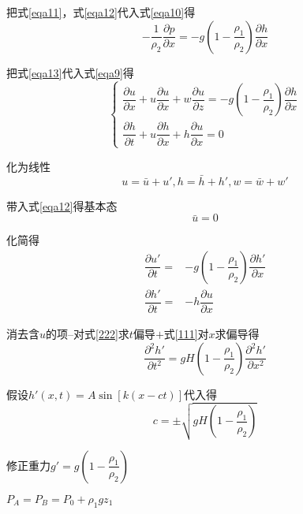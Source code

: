 \documentclass[a4paper,oneside]{ctexbook}
\begin{document}
把式\ref{eqa11}，式\ref{eqa12}代入式\ref{eqa10}得
\begin{equation}
    -\dfrac{1}{\rho_2}\dfrac{\partial{p}}{\partial{x}}=-g\left(1-\dfrac{\rho_1}{\rho_2}\right)\dfrac{\partial{h}}{\partial{x}}\label{eqa13}
\end{equation}

把式\ref{eqa13}代入式\ref{eqa9}得
\begin{equation}
    \begin{cases}
    \dfrac{\partial{u}}{\partial{x}}+u\dfrac{\partial{u}}{\partial{x}}+w\dfrac{\partial{u}}{\partial{z}}=-g\left(1-\dfrac{\rho_1}{\rho_2}\right)\dfrac{\partial{h}}{\partial{x}}\\
    \dfrac{\partial{h}}{\partial{t}}+u\dfrac{\partial{h}}{\partial{x}}+h\dfrac{\partial{u}}{\partial{x}}=0
    \end{cases}
\end{equation}

化为线性
\begin{equation}
    u=\bar{u}+u',h=\bar{h}+h',w=\bar{w}+w'
\end{equation}

带入式\ref{eqa12}得基本态
\begin{equation}
    \bar{u}=0
\end{equation}

化简得
\begin{align}
    \dfrac{\partial{u'}}{\partial{t}} =& -g\left(1-\dfrac{\rho_1}{\rho_2}\right)\dfrac{\partial{h'}}{\partial{x}} \label{111}\\
    \dfrac{\partial{h'}}{\partial{t}} =& -h\dfrac{\partial{u}}{\partial{x}} \label{222}
\end{align}

消去含\(u\)的项--对式\ref{222}求\(t\)偏导\(+\)式\ref{111}对\(x\)求偏导得
\begin{equation}
    \dfrac{\partial^2h'}{\partial{t^2}}=gH\left(1-\dfrac{\rho_1}{\rho_2}\right)\dfrac{\partial^2h'}{\partial{x^2}}
\end{equation}

假设\(h'(x,t)=A\sin{}[k(x-ct)]\)代入得
\begin{equation}
    c=\pm\sqrt{gH\left(1-\dfrac{\rho_1}{\rho_2}\right)}
\end{equation}

修正重力\(g'=g\left(1-\dfrac{\rho_1}{\rho_2}\right)\)
\begin{figure}[htbp]
    \centering%
\end{figure}
\(P_A=P_B=P_0+\rho_1gz_1\)
\end{document}
